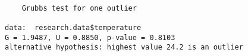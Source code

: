 \begin{verbatim} 

	Grubbs test for one outlier

data:  research.data$temperature
G = 1.9487, U = 0.8850, p-value = 0.8103
alternative hypothesis: highest value 24.2 is an outlier

\end{verbatim}